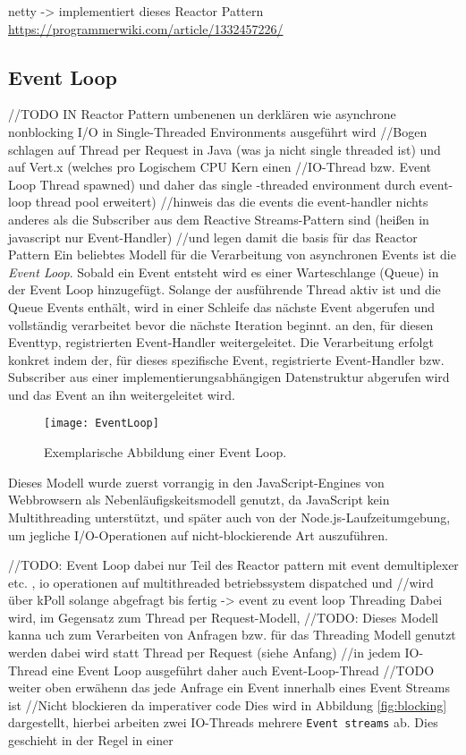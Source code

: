 netty -> implementiert dieses Reactor Pattern
\url{https://programmerwiki.com/article/1332457226/}
\parencite[Kapitel 9]{NodeJSDesignPatterns}
\parencite{SchmidtReactorPattern}
\parencite[Kapitel 1]{NettyInAction}
\subsection{Event Loop}
\label{section:event_loop}
//TODO IN Reactor Pattern umbenenen un derklären wie asynchrone nonblocking I/O in Single-Threaded Environments ausgeführt wird
//Bogen schlagen auf Thread per Request in Java (was ja nicht single threaded ist) und auf Vert.x (welches pro Logischem CPU Kern einen
//IO-Thread bzw. Event Loop Thread spawned) und daher das single -threaded environment durch event-loop thread pool erweitert)
//hinweis das die events die event-handler nichts anderes als die Subscriber aus dem Reactive Streams-Pattern sind (heißen in javascript nur Event-Handler)
//und legen damit die basis für das Reactor Pattern
Ein beliebtes Modell für die Verarbeitung von asynchronen Events ist die \textit{Event Loop}.
Sobald ein Event entsteht wird es einer Warteschlange (Queue) in der Event Loop hinzugefügt.
Solange der ausführende Thread aktiv ist und die Queue Events enthält, wird in einer Schleife das nächste Event
abgerufen und vollständig verarbeitet bevor die nächste Iteration beginnt.
an den, für diesen Eventtyp, registrierten Event-Handler weitergeleitet.
Die Verarbeitung erfolgt konkret indem der, für dieses spezifische Event, registrierte Event-Handler bzw. Subscriber aus einer implementierungsabhängigen
Datenstruktur abgerufen wird und das Event an ihn weitergeleitet wird.
\begin{figure}[h!]
	\centering
	\texttt{[image: EventLoop]}
	\caption{Exemplarische Abbildung einer Event Loop. \parencite[Kapitel 1.7]{Ponge2020}}
\end{figure}

Dieses Modell wurde zuerst vorrangig in den JavaScript-Engines von Webbrowsern als Nebenläufigskeitsmodell genutzt, da JavaScript kein Multithreading
unterstützt,\parencite{MozillaEventLoop} und später auch von der Node.js-Laufzeitumgebung,
um jegliche I/O-Operationen auf nicht-blockierende Art auszuführen.\parencite{NodeJSEventLoop}


//TODO: Event Loop dabei nur Teil des Reactor pattern mit event demultiplexer etc. , io operationen auf multithreaded betriebssystem dispatched und
//wird über kPoll solange abgefragt bis fertig -> event zu event loop
Threading Dabei wird, im Gegensatz zum Thread per Request-Modell,
//TODO: Dieses Modell kanna uch zum Verarbeiten von Anfragen bzw. für das Threading Modell genutzt werden dabei wird statt Thread per Request (siehe Anfang)
//in jedem IO-Thread eine Event Loop ausgeführt daher auch Event-Loop-Thread
//TODO weiter oben erwähenn das jede Anfrage ein Event innerhalb eines Event Streams ist
//Nicht blockieren da imperativer code
Dies wird in Abbildung \ref{fig:blocking} dargestellt, hierbei arbeiten zwei IO-Threads mehrere \verb|Event streams| ab. Dies geschieht in der Regel in einer

